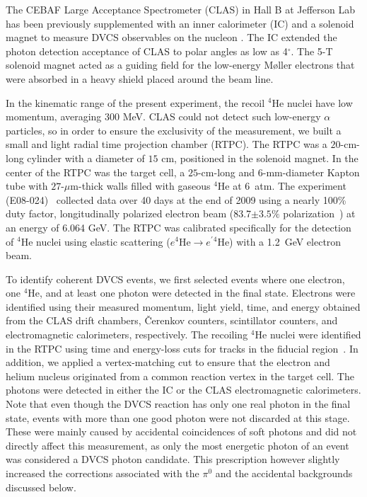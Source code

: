 \documentclass[twocolumn,nofootinbib,showpacs,prl,superscriptaddress,secnumarabic,amssymb,nobibnotes,aps,floatfix]{revtex4}
\begin{document}
The CEBAF Large Acceptance Spectrometer (CLAS) in Hall B at Jefferson 
Lab~\cite{Mecking:2003zu} has been previously supplemented with an inner 
calorimeter (IC) and a solenoid magnet to measure DVCS observables on the nucleon
\cite{Girod:2007aa,Gavalian:2009,Seder:2015,Pisano:2015,Jo:2015ema}. The IC 
extended the photon detection acceptance of CLAS to polar angles as low as 
4$^{\circ}$. The 5-T solenoid magnet acted as a guiding field for the 
low-energy M\o{}ller electrons that were absorbed in a  
heavy shield placed around the beam line. 

In the kinematic range of the present experiment, the recoil $^4$He nuclei 
have low momentum, averaging 300 MeV. CLAS could not detect such low-energy $\alpha$ 
particles, so in order to ensure the exclusivity of the measurement, we built a 
small and light radial time projection chamber (RTPC). The 
RTPC was a $20$-cm-long cylinder with a diameter of $15$ cm, positioned in the 
solenoid magnet. In the center of the RTPC was the target cell, a $25$-cm-long 
and $6$-mm-diameter Kapton tube with $27$-$\mu$m-thick walls filled with 
gaseous $^4$He at 6~atm. The experiment (E08-024)~\cite{Hafidi:2008pr} collected
data over 40 days at the end of 2009 using a 
nearly 100\% duty factor, longitudinally polarized electron beam (83.7$\pm 3.5 \%$ 
polarization~\cite{Perrin:thesis}) at an energy of 6.064 GeV. The RTPC was calibrated specifically 
for the detection of $^4$He nuclei using elastic scattering 
($e^4$He$\to e^\prime$$^4$He) with a 1.2~GeV electron beam.
 
To identify coherent DVCS events, we first selected events where one electron, 
one $^4$He, and at least one photon were detected in the final state. Electrons 
were identified using their measured momentum, light yield, time, and energy obtained from 
the CLAS drift chambers, \v{C}erenkov counters, scintillator counters, 
and electromagnetic calorimeters, respectively. The recoiling $^4$He nuclei 
were identified in the RTPC using time and energy-loss cuts for tracks in the 
fiducial region~\cite{Hattawy:thesis}. In addition, we applied a vertex-matching 
cut to ensure that the 
electron and helium nucleus originated from a common reaction vertex in the 
target cell. The photons were 
detected in either the IC or the CLAS electromagnetic calorimeters. Note that 
even though the DVCS reaction has only one real photon in the final state, 
events with more than one good photon were not discarded at this stage. These
were mainly caused by accidental coincidences of soft photons and did not directly
affect this measurement, as only the most energetic photon of an 
event was considered a DVCS photon candidate.
This prescription however slightly increased the corrections associated with
the $\pi^0$ and the accidental backgrounds discussed below. 
\end{document}
